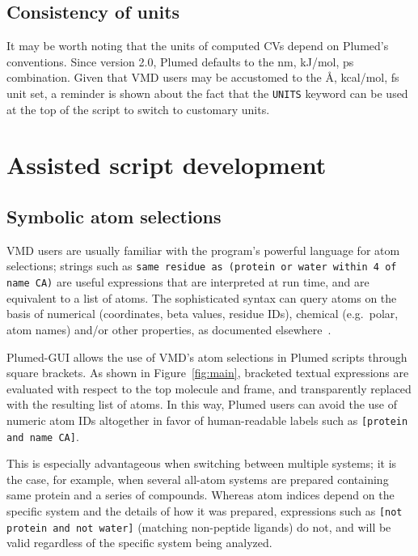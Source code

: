 \documentclass[preprint,review,11pt]{elsarticle}
\begin{document}


\subsection{Consistency of units}

It may be worth noting that the units of computed CVs depend on
Plumed's conventions.  Since version 2.0, Plumed defaults to the nm,
kJ/mol, ps combination. Given that VMD users may be accustomed to the
\AA, kcal/mol, fs unit set, a reminder is shown about the fact that
the \texttt{UNITS} keyword can be used at the top of the script to
switch to customary units.



\section{Assisted script development}


\subsection{Symbolic atom selections}\label{sec:symb-atom-select}

VMD users are usually familiar with the program's powerful language
for atom selections; strings such as \texttt{same residue as (protein
  or water within 4 of name CA)} are useful expressions that are
interpreted at run time, and are equivalent to a list of atoms.  The
sophisticated syntax can query atoms on the basis of numerical
(coordinates, beta values, residue IDs), chemical (e.g.\ polar, atom
names) and/or other properties, as documented
elsewhere~\cite{Humphrey_Dalke_Schulten_1996}.

Plumed-GUI allows the use of VMD's atom selections in Plumed scripts
through  square brackets. As shown in Figure~\ref{fig:main},
bracketed textual expressions  are evaluated with respect to
the top molecule and frame, and transparently replaced with the
resulting list of atoms. In this way, Plumed users can 
avoid the use of numeric atom IDs altogether in favor of human-readable
labels such as \texttt{[protein and name CA]}.

This is especially advantageous when switching between multiple
systems; it is the case, for example, when several all-atom systems
are prepared containing same protein and a series of compounds.
Whereas atom indices depend on the specific system and the details of
how it was prepared, expressions such as \texttt{[not protein
  and not water]} (matching non-peptide ligands) do not, and will be
valid regardless of the specific system being analyzed.
\end{document}
